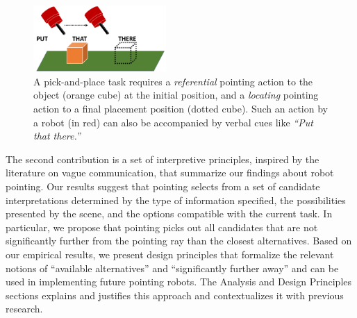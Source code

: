 \begin{figure}[t]
    \centering
    \includegraphics[width=0.45\textwidth, trim={0 0.3in 0 0in},clip]{figures/putthatthere2.png}
    \caption{A pick-and-place task requires a \textit{referential} pointing action to the object (orange cube) at the initial position, and a \textit{locating} pointing action to a final placement position (dotted cube). Such an action by a robot (in red) can also be accompanied by verbal cues like \textit{``Put that there.''}}
    \label{fig:pap}
\end{figure}

The second contribution is a set of interpretive principles, inspired by the literature on vague communication, that summarize our findings about robot pointing.  Our results suggest that pointing selects from a set of candidate interpretations determined by the type of information specified, the possibilities presented by the scene, and the options compatible with the current task.  In particular, we propose that pointing picks out all candidates that are not significantly further from the pointing ray than the closest alternatives.  Based on our empirical results, we present design principles that formalize the relevant notions of ``available alternatives'' and ``significantly further away'' and can be used in implementing future pointing robots.  The Analysis and Design Principles sections explains and justifies this approach and contextualizes it with previous research.




